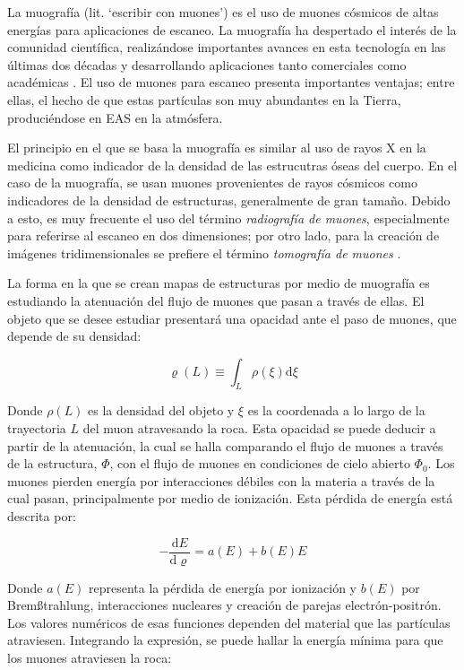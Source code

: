 \documentclass[12pt]{report}
\begin{document}
La muografía (lit. `escribir con muones') es el uso de muones cósmicos de altas energías para aplicaciones de escaneo. La muografía ha despertado el interés de la comunidad científica, realizándose importantes avances en esta tecnología en las últimas dos décadas y desarrollando aplicaciones tanto comerciales como académicas \cite{kaiser2019muography}. El uso de muones para escaneo presenta importantes ventajas; entre ellas, el hecho de que estas partículas son muy abundantes en la Tierra, produciéndose en EAS en la atmósfera.

El principio en el que se basa la muografía es similar al uso de rayos X en la medicina como indicador de la densidad de las estrucutras óseas del cuerpo. En el caso de la muografía, se usan muones provenientes de rayos cósmicos como indicadores de la densidad de estructuras, generalmente de gran tamaño. Debido a esto, es muy frecuente el uso del término \textit{radiografía de muones}, especialmente para referirse al escaneo en dos dimensiones; por otro lado, para la creación de imágenes tridimensionales se prefiere el término \textit{tomografía de muones} \cite{kaiser2019muography}.

La forma en la que se crean mapas de estructuras por medio de muografía es estudiando la atenuación del flujo de muones que pasan a través de ellas. El objeto que se desee estudiar presentará una opacidad ante el paso de muones, que depende de su densidad:


\begin{equation}\varrho(L) \equiv \int_{L} \rho(\xi) \mathrm{d} \xi\end{equation}

Donde $\rho(L)$ es la densidad del objeto y $\xi$ es la coordenada a lo largo de la trayectoria $L$ del muon atravesando la roca. Esta opacidad se puede deducir a partir de la atenuación, la cual se halla comparando el flujo de muones a través de la estructura, $\Phi$, con el flujo de muones en condiciones de cielo abierto $\Phi_0$. Los muones pierden energía por interacciones débiles con la materia a través de la cual pasan, principalmente por medio de ionización. Esta pérdida de energía está descrita por:

\begin{equation}
    -\frac{\mathrm{d} E}{\mathrm{d} \varrho}=a(E)+b(E) E
    \label{eq:energyloss}
\end{equation}

Donde $a(E)$ representa la pérdida de energía por ionización y $b(E)$ por Brem\ss trahlung, interacciones nucleares y creación de parejas electrón-positrón. Los valores numéricos de esas funciones dependen del material que las partículas atraviesen. Integrando la expresión, se puede hallar la energía mínima para que los muones atraviesen la roca:
\end{document}
